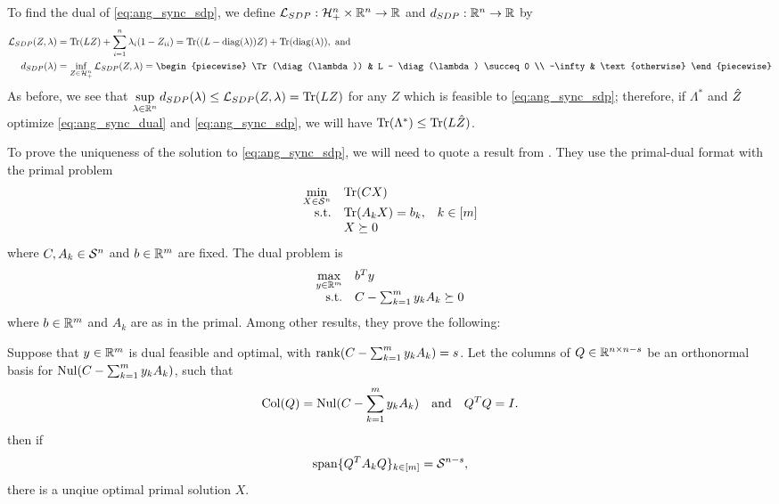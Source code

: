 To find the dual of \eqref{eq:ang_sync_sdp}, we define $\mathcal{L}_{SDP} : \mathcal{H}_+^n \times \mathbb{R}^n \to \mathbb{R}$ and $d_{SDP} : \mathbb{R}^n \to \mathbb{R}$ by
\begin{align*}
  \Lc_{SDP}(Z, \lambda) &= \Tr(LZ) + \sum_{i = 1}^n \lambda_i(1 - Z_{ii}) = \Tr((L - \diag(\lambda)) Z) + \Tr(\diag(\lambda)), \ \text{and} \\
  d_{SDP}(\lambda) &= \inf_{Z \in \H^n_+} \Lc_{SDP}(Z, \lambda) = \begin{piecewise} \Tr(\diag(\lambda)) & L - \diag(\lambda) \succeq 0 \\ -\infty & \text{otherwise} \end{piecewise}
\end{align*}
As before, we see that $\sup\limits_{\lambda \in \mathbb{R}^n} d_{SDP}(\lambda) \le \mathcal{L}_{SDP}(Z, \lambda) = \operatorname{Tr}(LZ)$ for any $Z$ which is feasible to \eqref{eq:ang_sync_sdp}; therefore, if $\Lambda^*$ and $\hat{Z}$ optimize \eqref{eq:ang_sync_dual} and \eqref{eq:ang_sync_sdp}, we will have $\operatorname{Tr}(\Lambda^*) \le \operatorname{Tr}(L\hat{Z})$.

To prove the uniqueness of the solution to \eqref{eq:ang_sync_sdp}, we will need to quote a result from \cite{alizadeh1997nondegeneracy}.  They use the primal-dual format with the primal problem
\begin{equation}
  \begin{array}{rlc}
    \displaystyle \min_{X \in \mathcal{S}^n} & \operatorname{Tr}(C X) \\
    \text{s.t.} & \operatorname{Tr}(A_k X) = b_k, & k \in [m] \\
    & X \succeq 0
  \end{array} \label{eq:alizadeh_primal}
\end{equation}
where $C, A_k \in \mathcal{S}^n$ and $b \in \mathbb{R}^m$ are fixed.  The dual problem is
\begin{equation}
  \begin{array}{rl}
    \displaystyle\max_{y \in \mathbb{R}^m} & b^T y \\
    \text{s.t.} & C - \sum_{k = 1}^m y_k A_k \succeq 0
  \end{array} \label{eq:alizadeh_dual}
\end{equation}
where $b \in \mathbb{R}^m$ and $A_k$ are as in the primal.  Among other results, they prove the following:

\begin{proposition}
  Suppose that $y \in \mathbb{R}^m$ is dual feasible and optimal, with $\operatorname{rank}(C - \sum_{k = 1}^m y_k A_k) = s$.  Let the columns of $Q \in \mathbb{R}^{n \times n - s}$ be an orthonormal basis for $\operatorname{Nul}(C - \sum_{k = 1}^m y_k A_k)$, such that  \[\operatorname{Col}(Q) = \operatorname{Nul}(C - \sum_{k = 1}^m y_k A_k) \quad \text{and} \quad Q^T Q = I.\] then if \begin{equation} \operatorname{span} \{Q^T A_k Q\}_{k \in [m]} = \mathcal{S}^{n - s} \label{eq:dual_nondegen},\end{equation} there is a unqiue optimal primal solution $X$. \label{prop:primal_unique}
\end{proposition}

